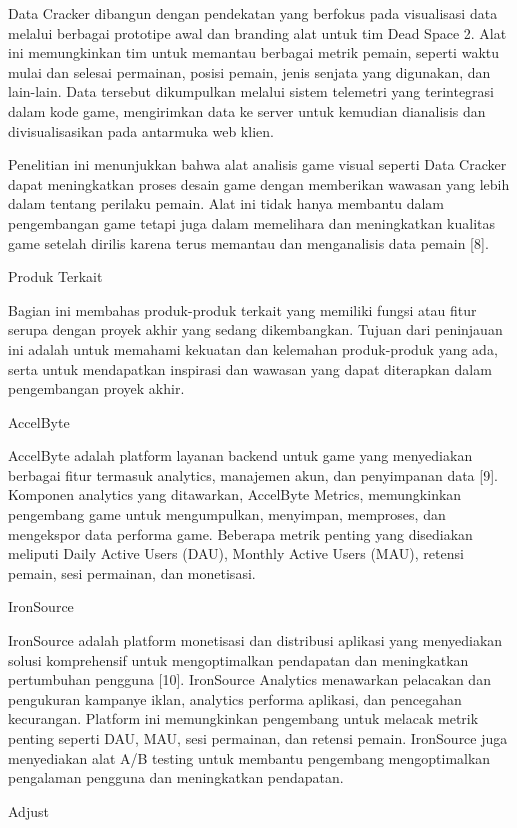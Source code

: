 Data Cracker dibangun dengan pendekatan yang berfokus pada visualisasi data melalui berbagai prototipe awal dan branding alat untuk tim Dead Space 2. Alat ini memungkinkan tim untuk memantau berbagai metrik pemain, seperti waktu mulai dan selesai permainan, posisi pemain, jenis senjata yang digunakan, dan lain-lain. Data tersebut dikumpulkan melalui sistem telemetri yang terintegrasi dalam kode game, mengirimkan data ke server untuk kemudian dianalisis dan divisualisasikan pada antarmuka web klien.

Penelitian ini menunjukkan bahwa alat analisis game visual seperti Data Cracker dapat meningkatkan proses desain game dengan memberikan wawasan yang lebih dalam tentang perilaku pemain. Alat ini tidak hanya membantu dalam pengembangan game tetapi juga dalam memelihara dan meningkatkan kualitas game setelah dirilis karena terus memantau dan menganalisis data pemain [8].

Produk Terkait

Bagian ini membahas produk-produk terkait yang memiliki fungsi atau fitur serupa dengan proyek akhir yang sedang dikembangkan. Tujuan dari peninjauan ini adalah untuk memahami kekuatan dan kelemahan produk-produk yang ada, serta untuk mendapatkan inspirasi dan wawasan yang dapat diterapkan dalam pengembangan proyek akhir.

AccelByte

AccelByte adalah platform layanan backend untuk game yang menyediakan berbagai fitur termasuk analytics, manajemen akun, dan penyimpanan data [9]. Komponen analytics yang ditawarkan, AccelByte Metrics, memungkinkan pengembang game untuk mengumpulkan, menyimpan, memproses, dan mengekspor data performa game. Beberapa metrik penting yang disediakan meliputi Daily Active Users (DAU), Monthly Active Users (MAU), retensi pemain, sesi permainan, dan monetisasi.

IronSource

IronSource adalah platform monetisasi dan distribusi aplikasi yang menyediakan solusi komprehensif untuk mengoptimalkan pendapatan dan meningkatkan pertumbuhan pengguna [10]. IronSource Analytics menawarkan pelacakan dan pengukuran kampanye iklan, analytics performa aplikasi, dan pencegahan kecurangan. Platform ini memungkinkan pengembang untuk melacak metrik penting seperti DAU, MAU, sesi permainan, dan retensi pemain. IronSource juga menyediakan alat A/B testing untuk membantu pengembang mengoptimalkan pengalaman pengguna dan meningkatkan pendapatan.

Adjust

